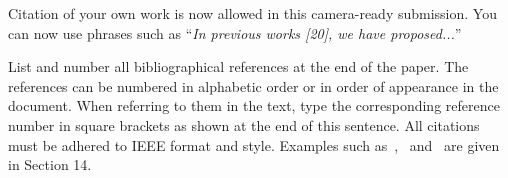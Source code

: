\documentclass{article}
\begin{document}
Citation of your own work is now allowed in this camera-ready
submission. You can now use phrases such as ``\emph{In previous
works [20], we have proposed...}''

List and number all bibliographical references at the end of the
paper. The references can be numbered in alphabetic order or in
order of appearance in the document. When referring to them in the
text, type the corresponding reference number in square brackets as
shown at the end of this sentence. All citations must be adhered to
IEEE format and style. Examples such
as~\cite{Morgan2005},~\cite{cooley65} and~\cite{haykin02} are given
in Section 14.



\end{document}
